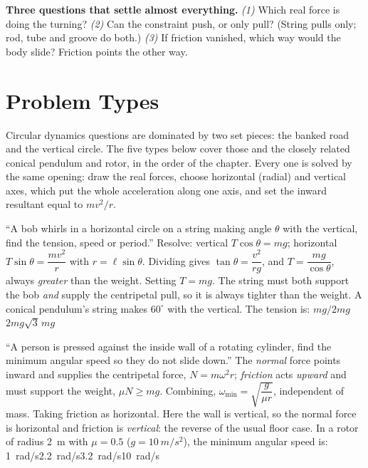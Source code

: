 \medskip
\textbf{Three questions that settle almost everything.}
\emph{(1)} Which real force is doing the turning?
\emph{(2)} Can the constraint push, or only pull? (String pulls only; rod, tube and groove do both.)
\emph{(3)} If friction vanished, which way would the body slide? Friction points the other way.

\section{Problem Types}\label{sec:types10}
Circular dynamics questions are dominated by two set pieces: the banked road and the vertical circle.
The five types below cover those and the closely related conical pendulum and rotor, in the order of the
chapter. Every one is solved
by the same opening: draw the real forces, choose horizontal (radial) and vertical axes, which put the
whole acceleration along one axis, and set the inward resultant equal to $mv^2/r$.

{``A bob whirls in a horizontal circle on a string making angle $\theta$ with the vertical, find the
tension, speed or period.''}
{Resolve: vertical $T\cos\theta=mg$; horizontal $T\sin\theta=\dfrac{mv^2}{r}$ with $r=\ell\sin\theta$.
Dividing gives $\tan\theta=\dfrac{v^2}{rg}$, and $T=\dfrac{mg}{\cos\theta}$, always \emph{greater}
than the weight.}
{Setting $T=mg$. The string must both support the bob \emph{and} supply the centripetal pull, so it is
always tighter than the weight.}
{A conical pendulum's string makes $60^\circ$ with the vertical. The tension is:}
{$mg/2$}{$mg$}{$2mg$}{$\sqrt3\,mg$}

{``A person is pressed against the inside wall of a rotating cylinder, find the minimum angular speed
so they do not slide down.''}
{The \emph{normal} force points inward and supplies the centripetal force, $N=m\omega^2r$; \emph{friction}
acts \emph{upward} and must support the weight, $\mu N\ge mg$. Combining,
$\boxed{\omega_{\min}=\sqrt{\dfrac{g}{\mu r}}}$, independent of mass.}
{Taking friction as horizontal. Here the wall is vertical, so the normal force is horizontal and
friction is \emph{vertical}: the reverse of the usual floor case.}
{In a rotor of radius \SI{2}{m} with $\mu=0.5$ ($g=\SI{10}{m/s^2}$), the minimum angular speed is:}
{\SI{1}{rad/s}}{\SI{2.2}{rad/s}}{\SI{3.2}{rad/s}}{\SI{10}{rad/s}}


